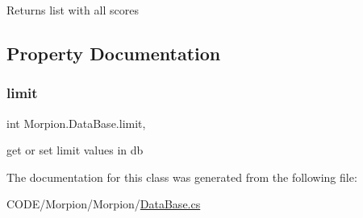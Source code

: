\begin{DoxyReturn}{Returns}
list with all scores
\end{DoxyReturn}


\subsection{Property Documentation}
\mbox{\label{class_morpion_1_1_data_base_ac0104fe497ec69fc184498e3e904b41f}} 
\subsubsection{\texorpdfstring{limit}{limit}}
{\footnotesize\ttfamily int Morpion.\+Data\+Base.\+limit\hspace{0.3cm}{\ttfamily [get]}, {\ttfamily [set]}}



get or set limit values in db 



The documentation for this class was generated from the following file\+:\begin{DoxyCompactItemize}
\item 
C\+O\+D\+E/\+Morpion/\+Morpion/\hyperlink{_data_base_8cs}{Data\+Base.\+cs}\end{DoxyCompactItemize}
